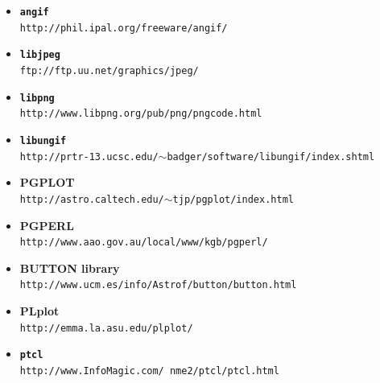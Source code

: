 \documentclass[twoside,11pt]{article}
\newcommand{\htmladdnormallink}[2]{#1}
\begin{document}
\begin{itemize}
\item {\bf\label{sc15_available_libangif}{\tt angif}}\\
\htmladdnormallink{{\tt http://phil.ipal.org/freeware/angif/}}{http://phil.ipal.org/freeware/angif/}

\item {\bf\label{sc15_available_libjpeg}{\tt libjpeg}}\\
\htmladdnormallink{{\tt ftp://ftp.uu.net/graphics/jpeg/}}{ftp://ftp.uu.net/graphics/jpeg/}

\item {\bf\label{sc15_available_libpng}{\tt libpng}}\\
\htmladdnormallink{{\tt http://www.libpng.org/pub/png/pngcode.html}}{http://www.libpng.org/pub/png/pngcode.html}

 \item {\bf\label{sc15_available_libungif}{\tt libungif}}\\
\htmladdnormallink{{\tt http://prtr-13.ucsc.edu/$\sim$badger/software/libungif/index.shtml}}{http://prtr-13.ucsc.edu/~badger/software/libungif/index.shtml} 

\item {\bf\label{sc15_available_pgplot}PGPLOT}\\
\htmladdnormallink{{\tt http://astro.caltech.edu/$\sim$tjp/pgplot/index.html}}{http://astro.caltech.edu/~tjp/pgplot/index.html}

\item {\bf\label{sc15_available_pgperl}PGPERL}\\
\htmladdnormallink{{\tt http://www.aao.gov.au/local/www/kgb/pgperl/}}{http://www.aao.gov.au/local/www/kgb/pgperl/}

\item {\bf\label{sc15_available_button}BUTTON library}\\
\htmladdnormallink{{\tt http://www.ucm.es/info/Astrof/button/button.html}}{http://www.ucm.es/info/Astrof/button/button.html}

\item {\bf\label{sc15_available_plplot}PLplot}\\
\htmladdnormallink{{\tt http://emma.la.asu.edu/plplot/}}{http://emma.la.asu.edu/plplot/}

\item {\bf\label{sc15_available_ptcl}{\tt ptcl}}\\
\htmladdnormallink{{\tt http://www.InfoMagic.com/~nme2/ptcl/ptcl.html}}{http://www.InfoMagic.com/~nme2/ptcl/ptcl.html}


\end{itemize}
\end{document}
